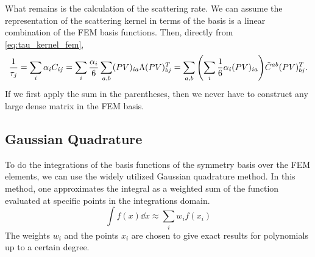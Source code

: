 \documentclass[12pt]{article}
\begin{document}
What remains is the calculation of the scattering rate. We can assume the representation of the
scattering kernel in terms of the basis is a linear combination of the FEM basis functions. Then,
directly from \eqref{eq:tau_kernel_fem},
\begin{equation}
    \frac{1}{\tau_j} = \sum_{i} \alpha_i C_{ij} =
    \sum_i \frac{\alpha_i}{6} \sum_{a,b} (PV)_{ia} \Lambda (P V)^T_{bj} =
    \sum_{a,b} \qty(\sum_i \frac{1}{6} \alpha_i (PV)_{ia}) \tilde{C}^{ab} (P V)^T_{bj}.
\end{equation}
If we first apply the sum in the parentheses, then we never have to construct any large dense
matrix in the FEM basis.

\subsection{Gaussian Quadrature}
To do the integrations of the basis functions of the symmetry basis over the FEM elements, we can
use the widely utilized Gaussian quadrature method. In this method, one approximates the integral
as a weighted sum of the function evaluated at specific points in the integrations domain.
\begin{equation}
    \int f(x)\dd{x} \approx \sum_i w_i f(x_i)
\end{equation}
The weights $w_i$ and the points $x_i$ are chosen to give exact results for polynomials up to a
certain degree.
\end{document}
